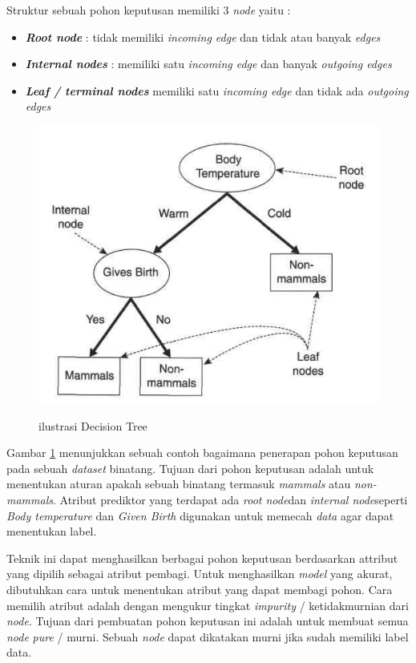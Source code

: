 \documentclass[a4paper,twoside]{article}
\begin{document}
\begin{enumerate}
Struktur sebuah pohon keputusan memiliki 3 \textit{node} yaitu : 
\begin{itemize}
\item \textbf{\textit{Root node}} : tidak memiliki \textit{incoming edge} dan tidak atau banyak \textit{edges}
\item \textbf{\textit{Internal nodes}} : memiliki satu \textit{incoming edge} dan banyak \textit{outgoing edges} 
\item \textbf{\textit{Leaf / terminal nodes}} memiliki satu \textit{incoming edge} dan tidak ada \textit{outgoing edges}
\end{itemize}
\pagebreak
\begin{figure}[h!]
	\centering  
	\includegraphics[scale=0.4]{decisiontreeexample}   
	\label{fig:decisiontreeexample} 
	\caption{ilustrasi Decision Tree}
\end{figure} 

Gambar \ref{fig:decisiontreeexample} menunjukkan sebuah contoh bagaimana penerapan pohon keputusan pada sebuah \textit{dataset} binatang. Tujuan dari pohon keputusan adalah untuk menentukan aturan apakah sebuah binatang termasuk \textit{mammals} atau \textit{non-mammals}. Atribut prediktor yang terdapat ada \textit{root node}dan \textit{internal node}seperti \textit{Body temperature} dan \textit{Given Birth} digunakan untuk memecah \textit{data} agar dapat menentukan label. 


Teknik ini dapat menghasilkan berbagai pohon keputusan berdasarkan attribut yang dipilih sebagai atribut pembagi. Untuk menghasilkan \textit{model} yang akurat, dibutuhkan cara untuk menentukan atribut yang dapat membagi pohon. Cara memilih atribut adalah dengan mengukur tingkat \textit{impurity} / ketidakmurnian dari \textit{node}. Tujuan dari pembuatan pohon keputusan ini adalah untuk membuat semua \textit{node} \textit{pure} / murni. Sebuah \textit{node} dapat dikatakan murni jika sudah memiliki label data. 


\end{enumerate}
\end{document}
